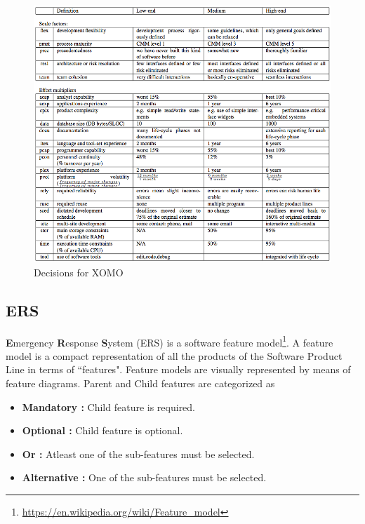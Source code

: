 \documentclass[conference]{IEEEtran}
\begin{document}
	\begin{figure}[htbp]
    \begin{minipage}{\linewidth}
        \centering
        \includegraphics[width=\linewidth]{img/XOMO_decisions.png}
		\caption{Decisions for XOMO}
		\label{fig:xomo_decisions}
    \end{minipage}
    \end{figure}
    
    \subsection{ERS}
    \label{ers}
    \textbf{E}mergency \textbf{R}esponse \textbf{S}ystem (ERS) is a software feature model\footnote{\url{https://en.wikipedia.org/wiki/Feature_model}}. A feature model is a compact representation of all the products of the Software Product Line in terms of ``features". Feature models are visually represented by means of feature diagrams. Parent and Child features are categorized as 
    \begin{itemize}
	\item \textbf{Mandatory :} Child feature is required.
	\item \textbf{Optional :} Child feature is optional.
	\item \textbf{Or :} Atleast one of the sub-features must be selected.
	\item \textbf{Alternative :} One of the sub-features must be selected.
	\end{itemize}
	
\end{document}
